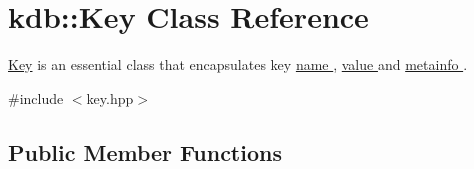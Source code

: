 \hypertarget{classkdb_1_1Key}{}\section{kdb\+:\+:Key Class Reference}
\label{classkdb_1_1Key}


\hyperlink{classkdb_1_1Key}{Key} is an essential class that encapsulates key \hyperlink{group__keyname}{name }, \hyperlink{group__keyvalue}{value } and \hyperlink{group__keymeta}{metainfo }.  




{\ttfamily \#include $<$key.\+hpp$>$}

\subsection*{Public Member Functions}
